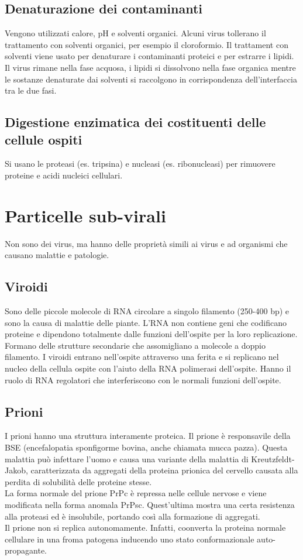 \subsection{Denaturazione dei contaminanti}
Vengono utilizzati calore, pH e solventi organici. Alcuni virus tollerano il trattamento con solventi organici, per esempio il cloroformio. Il trattament con solventi viene usato per denaturare i contaminanti proteici e per estrarre i lipidi. Il virus rimane nella fase acquosa, i lipidi si dissolvono nella fase organica mentre le sostanze denaturate dai solventi si raccolgono in corrispondenza dell'interfaccia tra le due fasi. 
\subsection{Digestione enzimatica dei costituenti delle cellule ospiti}
Si usano le proteasi (es. tripsina) e nucleasi (es. ribonucleasi) per rimuovere proteine e acidi nucleici cellulari. 
\section{Particelle sub-virali}
Non sono dei virus, ma hanno delle proprietà simili ai virus e ad organismi che causano malattie e patologie. 
\subsection{Viroidi}
Sono delle piccole molecole di RNA circolare a singolo filamento (250-400 bp) e sono la causa di malattie delle piante. L'RNA non contiene geni che codificano proteine e dipendono totalmente dalle funzioni dell'ospite per la loro replicazione. 
\\Formano delle strutture secondarie che assomigliano a molecole a doppio filamento. I viroidi entrano nell'ospite attraverso una ferita e si replicano nel nucleo della cellula ospite con l'aiuto della RNA polimerasi dell'ospite. Hanno il ruolo di RNA regolatori  che interferiscono con le normali funzioni dell'ospite. 
\subsection{Prioni}
I prioni hanno una struttura interamente proteica. Il prione è responsavile della BSE (encefalopatia sponfigorme bovina, anche chiamata mucca pazza). Questa malattia può infettare l'uomo e causa una variante della malattia di Kreutzfeldt-Jakob, caratterizzata da aggregati della proteina prionica del cervello causata alla perdita di solubilità delle proteine stesse.
\\La forma normale del prione PrPc è repressa nelle cellule nervose e viene modificata nella forma anomala PrPsc. Quest'ultima mostra una certa resistenza alla proteasi ed è insolubile, portando così alla formazione di aggregati. 
\\Il prione non si replica autonomamente. Infatti, coonverta la proteina normale cellulare in una froma patogena inducendo uno stato conformazionale auto-propagante.

